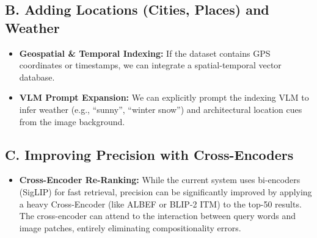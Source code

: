 \documentclass[11pt,a4paper]{article}
\begin{document}
\subsection*{B. Adding Locations (Cities, Places) and Weather}
\begin{itemize}
    \item \textbf{Geospatial \& Temporal Indexing:} If the dataset contains GPS coordinates or timestamps, we can integrate a spatial-temporal vector database.
    \item \textbf{VLM Prompt Expansion:} We can explicitly prompt the indexing VLM to infer weather (e.g., ``sunny'', ``winter snow'') and architectural location cues from the image background. 
\end{itemize}

\subsection*{C. Improving Precision with Cross-Encoders}
\begin{itemize}
    \item \textbf{Cross-Encoder Re-Ranking:} While the current system uses bi-encoders (SigLIP) for fast retrieval, precision can be significantly improved by applying a heavy Cross-Encoder (like ALBEF or BLIP-2 ITM) to the top-50 results. The cross-encoder can attend to the interaction between query words and image patches, entirely eliminating compositionality errors.
\end{itemize}
\end{document}
